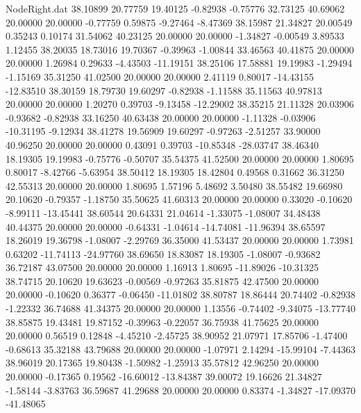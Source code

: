 \begin{filecontents}{NodeRight.dat}
  38.10899   20.77759   19.40125    -0.82938   -0.75776   32.73125   40.69062   20.00000   20.00000   -0.77759    0.59875   -9.27464   -8.47369
  38.15987   21.34827   20.00549     0.35243    0.10174   31.54062   40.23125   20.00000   20.00000   -1.34827   -0.00549    3.89533    1.12455
  38.20035   18.73016   19.70367    -0.39963   -1.00844   33.46563   40.41875   20.00000   20.00000    1.26984    0.29633   -4.43503  -11.19151
  38.25106   17.58881   19.19983    -1.29494   -1.15169   35.31250   41.02500   20.00000   20.00000    2.41119    0.80017  -14.43155  -12.83510
  38.30159   18.79730   19.60297    -0.82938   -1.11588   35.11563   40.97813   20.00000   20.00000    1.20270    0.39703   -9.13458  -12.29002
  38.35215   21.11328   20.03906    -0.93682   -0.82938   33.16250   40.63438   20.00000   20.00000   -1.11328   -0.03906  -10.31195   -9.12934
  38.41278   19.56909   19.60297    -0.97263   -2.51257   33.90000   40.96250   20.00000   20.00000    0.43091    0.39703  -10.85348  -28.03747
  38.46340   18.19305   19.19983    -0.75776   -0.50707   35.54375   41.52500   20.00000   20.00000    1.80695    0.80017   -8.42766   -5.63954
  38.50412   18.19305   18.42804     0.49568    0.31662   36.31250   42.55313   20.00000   20.00000    1.80695    1.57196    5.48692    3.50480
  38.55482   19.66980   20.10620    -0.79357   -1.18750   35.50625   41.60313   20.00000   20.00000    0.33020   -0.10620   -8.99111  -13.45441
  38.60544   20.64331   21.04614    -1.33075   -1.08007   34.48438   40.44375   20.00000   20.00000   -0.64331   -1.04614  -14.74081  -11.96394
  38.65597   18.26019   19.36798    -1.08007   -2.29769   36.35000   41.53437   20.00000   20.00000    1.73981    0.63202  -11.74113  -24.97760
  38.69650   18.83087   18.19305    -1.08007   -0.93682   36.72187   43.07500   20.00000   20.00000    1.16913    1.80695  -11.89026  -10.31325
  38.74715   20.10620   19.63623    -0.00569   -0.97263   35.81875   42.47500   20.00000   20.00000   -0.10620    0.36377   -0.06450  -11.01802
  38.80787   18.86444   20.74402    -0.82938   -1.22332   36.74688   41.34375   20.00000   20.00000    1.13556   -0.74402   -9.34075  -13.77740
  38.85875   19.43481   19.87152    -0.39963   -0.22057   36.75938   41.75625   20.00000   20.00000    0.56519    0.12848   -4.45210   -2.45725
  38.90952   21.07971   17.85706    -1.47400   -0.68613   35.32188   43.79688   20.00000   20.00000   -1.07971    2.14294  -15.99104   -7.44363
  38.96019   20.17365   19.80438    -1.50982   -1.25913   35.57812   42.96250   20.00000   20.00000   -0.17365    0.19562  -16.60012  -13.84387
  39.00072   19.16626   21.34827    -1.58144   -3.83763   36.59687   41.29688   20.00000   20.00000    0.83374   -1.34827  -17.09370  -41.48065

\end{filecontents}
